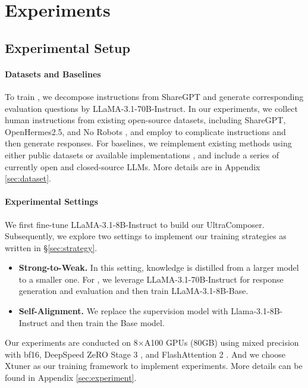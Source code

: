 \section{Experiments}
\subsection{Experimental Setup}

\paragraph{Datasets and Baselines}
To train \composer, we decompose instructions from ShareGPT \citep{vicuna2023} and generate corresponding evaluation questions by LLaMA-3.1-70B-Instruct.
In our experiments, we collect human instructions from existing open-source datasets, including ShareGPT, OpenHermes2.5, and No Robots \citep{OpenHermes,no_robots,vicuna2023}, and employ \composer to complicate instructions and then generate responses.
For baselines, we reimplement existing methods using either public datasets \citep{sun2024conifer,xu2023wizardlm} or available implementations \citep{dong2024self}, and include a series of currently open and closed-source LLMs. More details are in Appendix \ref{sec:dataset}.


\paragraph{Experimental Settings}
We first fine-tune LLaMA-3.1-8B-Instruct to build our UltraComposer.
Subsequently, we explore two settings to implement our training strategies as written in \S\ref{sec:strategy}.
\begin{itemize}[nolistsep,leftmargin=*]
    \setlength\itemsep{0mm}
    \item \textbf{Strong-to-Weak.} In this setting, knowledge is distilled from a larger model to a smaller one. For \method, we leverage LLaMA-3.1-70B-Instruct for response generation and evaluation and then train LLaMA-3.1-8B-Base.
    \item \textbf{Self-Alignment.} We replace the supervision model with Llama-3.1-8B-Instruct and then train the Base model.
\end{itemize}


Our experiments are conducted on 8$\times$A100 GPUs (80GB) using mixed precision with bf16, DeepSpeed ZeRO Stage 3 \citep{rasley2020deepspeed}, and FlashAttention 2 \citep{dao2023flashattention}. And we choose Xtuner \citep{2023xtuner} as our training framework to implement experiments. More details can be found in Appendix \ref{sec:experiment}.




